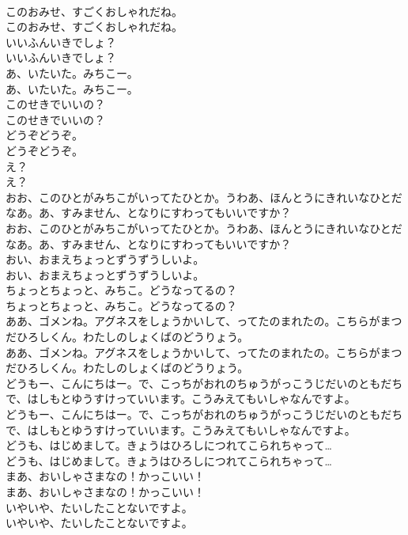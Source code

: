 \documentclass[8pt]{extreport}
\begin{document}
\begin{CJK}{UTF8}{min}
\\	このおみせ、すごくおしゃれだね。
\\	このおみせ、すごくおしゃれだね。
\\	いいふんいきでしょ？
\\	いいふんいきでしょ？
\\	あ、いたいた。みちこー。
\\	あ、いたいた。みちこー。
\\	このせきでいいの？
\\	このせきでいいの？
\\	どうぞどうぞ。
\\	どうぞどうぞ。
\\	え？
\\	え？
\\	おお、このひとがみちこがいってたひとか。うわあ、ほんとうにきれいなひとだなあ。あ、すみません、となりにすわってもいいですか？
\\	おお、このひとがみちこがいってたひとか。うわあ、ほんとうにきれいなひとだなあ。あ、すみません、となりにすわってもいいですか？
\\	おい、おまえちょっとずうずうしいよ。
\\	おい、おまえちょっとずうずうしいよ。
\\	ちょっとちょっと、みちこ。どうなってるの？
\\	ちょっとちょっと、みちこ。どうなってるの？
\\	ああ、ゴメンね。アグネスをしょうかいして、ってたのまれたの。こちらがまつだひろしくん。わたしのしょくばのどうりょう。
\\	ああ、ゴメンね。アグネスをしょうかいして、ってたのまれたの。こちらがまつだひろしくん。わたしのしょくばのどうりょう。
\\	どうもー、こんにちはー。で、こっちがおれのちゅうがっこうじだいのともだちで、はしもとゆうすけっていいます。こうみえてもいしゃなんですよ。
\\	どうもー、こんにちはー。で、こっちがおれのちゅうがっこうじだいのともだちで、はしもとゆうすけっていいます。こうみえてもいしゃなんですよ。
\\	どうも、はじめまして。きょうはひろしにつれてこられちゃって…
\\	どうも、はじめまして。きょうはひろしにつれてこられちゃって…
\\	まあ、おいしゃさまなの！かっこいい！
\\	まあ、おいしゃさまなの！かっこいい！
\\	いやいや、たいしたことないですよ。
\\	いやいや、たいしたことないですよ。

\end{CJK}
\end{document}
